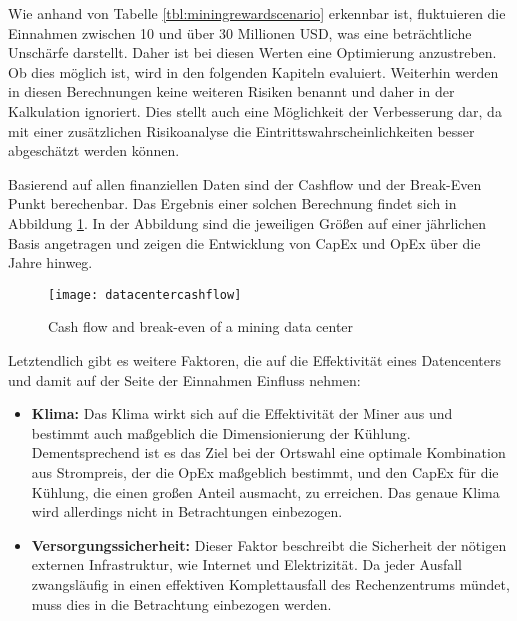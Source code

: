 Wie anhand von Tabelle \ref{tbl:miningrewardscenario} erkennbar ist, fluktuieren die Einnahmen zwischen 10 und über
30 Millionen \ac{USD}, was eine beträchtliche Unschärfe darstellt. Daher ist bei diesen Werten eine Optimierung anzustreben.
Ob dies möglich ist, wird in den folgenden Kapiteln evaluiert. Weiterhin werden in diesen Berechnungen keine weiteren
Risiken benannt und daher in der Kalkulation ignoriert. Dies stellt auch eine Möglichkeit der Verbesserung dar,
da mit einer zusätzlichen Risikoanalyse die Eintrittswahrscheinlichkeiten besser abgeschätzt werden können.

Basierend auf allen finanziellen Daten sind der Cashflow und der Break-Even Punkt berechenbar. Das Ergebnis einer
solchen Berechnung findet sich in Abbildung \ref{figure:datacentercashflow}. In der Abbildung sind die jeweiligen Größen
auf einer jährlichen Basis angetragen und zeigen die Entwicklung von \ac{CapEx} und \ac{OpEx} über die Jahre hinweg.

\begin{figure}[H]
    \caption{Cash flow and break-even of a mining data center}
    \texttt{[image: datacentercashflow]}
    \label{figure:datacentercashflow}
    \\
    \cite[Source: ][]{appendix:summaryofinvestment}
\end{figure}

Letztendlich gibt es weitere Faktoren, die auf die Effektivität eines Datencenters und damit auf der Seite der
Einnahmen Einfluss nehmen:
\begin{itemize}
    \item \textbf{Klima: }Das Klima wirkt sich auf die Effektivität der Miner aus und bestimmt auch maßgeblich
    die Dimensionierung der Kühlung. Dementsprechend ist es das Ziel bei der Ortswahl eine optimale Kombination aus
    Strompreis, der die \ac{OpEx} maßgeblich bestimmt, und den \ac{CapEx} für die Kühlung, die einen
    großen Anteil ausmacht, zu erreichen. Das genaue Klima wird allerdings nicht in Betrachtungen einbezogen.
    \item \textbf{Versorgungssicherheit: }Dieser Faktor beschreibt die Sicherheit der nötigen externen Infrastruktur,
    wie Internet und Elektrizität. Da jeder Ausfall zwangsläufig in einen effektiven Komplettausfall des Rechenzentrums
    mündet, muss dies in die Betrachtung einbezogen werden.
\end{itemize}
